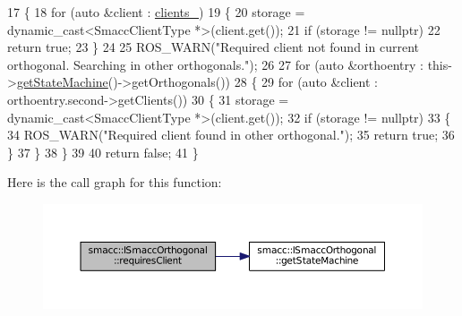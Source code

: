 \begin{DoxyCode}
17 \{
18     \textcolor{keywordflow}{for} (\textcolor{keyword}{auto} &client : \hyperlink{classsmacc_1_1ISmaccOrthogonal_a0f270e9c8c126198f6bce542ab4e04ba}{clients\_})
19     \{
20         storage = \textcolor{keyword}{dynamic\_cast<}SmaccClientType *\textcolor{keyword}{>}(client.get());
21         \textcolor{keywordflow}{if} (storage != \textcolor{keyword}{nullptr})
22             \textcolor{keywordflow}{return} \textcolor{keyword}{true};
23     \}
24 
25     ROS\_WARN(\textcolor{stringliteral}{"Required client not found in current orthogonal. Searching in other orthogonals."});
26 
27     \textcolor{keywordflow}{for} (\textcolor{keyword}{auto} &orthoentry : this->\hyperlink{classsmacc_1_1ISmaccOrthogonal_aae265ec480b8ed552ddc79afd2d93a62}{getStateMachine}()->getOrthogonals())
28     \{
29         \textcolor{keywordflow}{for} (\textcolor{keyword}{auto} &client : orthoentry.second->getClients())
30         \{
31             storage = \textcolor{keyword}{dynamic\_cast<}SmaccClientType *\textcolor{keyword}{>}(client.get());
32             \textcolor{keywordflow}{if} (storage != \textcolor{keyword}{nullptr})
33             \{
34                 ROS\_WARN(\textcolor{stringliteral}{"Required client found in other orthogonal."});
35                 \textcolor{keywordflow}{return} \textcolor{keyword}{true};
36             \}
37         \}
38     \}
39 
40     \textcolor{keywordflow}{return} \textcolor{keyword}{false};
41 \}
\end{DoxyCode}


Here is the call graph for this function\+:
\nopagebreak
\begin{figure}[H]
\begin{center}
\leavevmode
\includegraphics[width=350pt]{classsmacc_1_1ISmaccOrthogonal_a602e16b09f8a1b3de889f2f3d90a3211_cgraph}
\end{center}
\end{figure}




